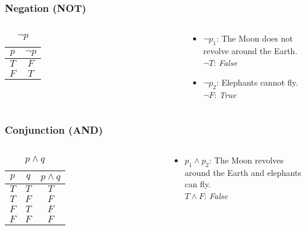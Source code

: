 \documentclass[dvipsnames]{beamer}
\begin{document}
\begin{frame}
  \frametitle{Negation (NOT)}

  \begin{columns}
    \begin{table}
      \caption{$\neg p$}
      \begin{tabular}{|c||c|}\hline
        $p$ & $\neg p$\\\hline\hline
        $T$ & $F$     \\\hline
        $F$ & $T$     \\\hline
      \end{tabular}
    \end{table}

    \pause
    \begin{example}
      \begin{itemize}
        \item $\neg p_1$: The Moon does not revolve around the Earth.\\
          $\neg T$: \emph{False}
        \item $\neg p_2$: Elephants cannot fly.\\
          $\neg F$: \emph{True}
      \end{itemize}
    \end{example}
  \end{columns}
\end{frame}

\begin{frame}
  \frametitle{Conjunction (AND)}

  \begin{columns}
    \begin{table}
      \caption{$p \wedge q$}
      \begin{tabular}{|c|c||c|}\hline
        $p$ & $q$ & $p \wedge q$\\\hline\hline
        $T$ & $T$ & $T$         \\\hline
        $T$ & $F$ & $F$         \\\hline
        $F$ & $T$ & $F$         \\\hline
        $F$ & $F$ & $F$         \\\hline
      \end{tabular}
    \end{table}

    \pause
    \begin{example}
      \begin{itemize}
        \item $p_1 \wedge p_2$: The Moon revolves around the Earth and elephants
          can fly.\\
          $T \wedge F$: \emph{False}
      \end{itemize}
    \end{example}
  \end{columns}
\end{frame}
\end{document}
